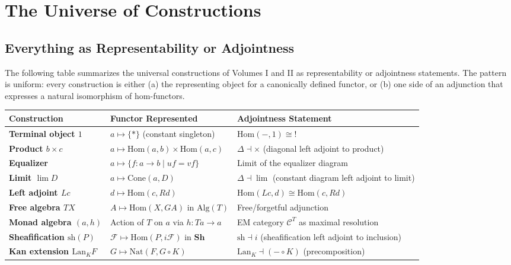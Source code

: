 \section{The Universe of Constructions}
\label{sec:universe-table}

\subsection{Everything as Representability or Adjointness}

The following table summarizes the universal constructions of Volumes I
and II as representability or adjointness statements. The pattern is
uniform: every construction is either (a) the representing object for a
canonically defined functor, or (b) one side of an adjunction that
expresses a natural isomorphism of hom-functors.

\begin{center}
\renewcommand{\arraystretch}{1.4}
\begin{tabular}{@{}>{\bfseries}p{3cm}p{4.5cm}p{5cm}@{}}
\hline
Construction & Functor Represented & Adjointness Statement \\
\hline
Terminal object $1$ &
  $a \mapsto \{*\}$ (constant singleton) &
  $\mathrm{Hom}(-, 1) \cong !$ \\
Product $b \times c$ &
  $a \mapsto \mathrm{Hom}(a,b) \times \mathrm{Hom}(a,c)$ &
  $\Delta \dashv \times$ (diagonal left adjoint to product) \\
Equalizer &
  $a \mapsto \{f: a \to b \mid uf = vf\}$ &
  Limit of the equalizer diagram \\
Limit $\lim D$ &
  $a \mapsto \mathrm{Cone}(a, D)$ &
  $\Delta \dashv \lim$ (constant diagram left adjoint to limit) \\
Left adjoint $Lc$ &
  $d \mapsto \mathrm{Hom}(c, Rd)$ &
  $\mathrm{Hom}(Lc, d) \cong \mathrm{Hom}(c, Rd)$ \\
Free algebra $TX$ &
  $A \mapsto \mathrm{Hom}(X, GA)$ in $\mathrm{Alg}(T)$ &
  Free/forgetful adjunction \\
Monad algebra $(a,h)$ &
  Action of $T$ on $a$ via $h: Ta \to a$ &
  EM category $\mathcal{C}^T$ as maximal resolution \\
Sheafification $\mathrm{sh}(P)$ &
  $\mathcal{F} \mapsto \mathrm{Hom}(P, i\mathcal{F})$ in $\mathbf{Sh}$ &
  $\mathrm{sh} \dashv i$ (sheafification left adjoint to inclusion) \\
Kan extension $\mathrm{Lan}_K F$ &
  $G \mapsto \mathrm{Nat}(F, G \circ K)$ &
  $\mathrm{Lan}_K \dashv (- \circ K)$ (precomposition) \\
\hline
\end{tabular}
\end{center}

